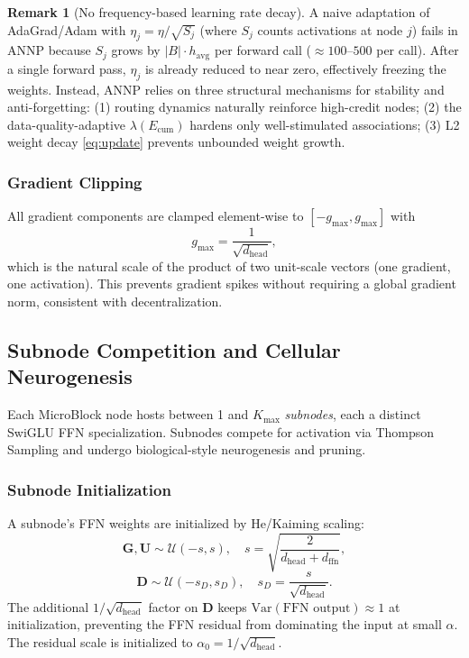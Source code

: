 \documentclass[11pt,a4paper]{article}
\theoremstyle{definition}
\newtheorem{remark}{Remark}[section]
\newcommand{\mG}{\mathbf{G}}
\newcommand{\mU}{\mathbf{U}}
\newcommand{\mD}{\mathbf{D}}
\begin{document}
\begin{remark}[No frequency-based learning rate decay]
  A naive adaptation of AdaGrad/Adam with $\eta_j = \eta / \sqrt{S_j}$ (where $S_j$ counts
  activations at node $j$) fails in ANNP because $S_j$ grows by $|B| \cdot h_\text{avg}$ per
  forward call ($\approx 100\text{--}500$ per call). After a single forward pass,
  $\eta_j$ is already reduced to near zero, effectively freezing the weights.
  Instead, ANNP relies on three structural mechanisms for stability and anti-forgetting:
  (1) routing dynamics naturally reinforce high-credit nodes;
  (2) the data-quality-adaptive $\lambda(E_\text{cum})$ hardens only well-stimulated associations;
  (3) L2 weight decay \eqref{eq:update} prevents unbounded weight growth.
\end{remark}

\subsubsection{Gradient Clipping}
All gradient components are clamped element-wise to $[-g_\text{max}, g_\text{max}]$ with
\begin{equation}
  g_\text{max} = \frac{1}{\sqrt{d_\text{head}}},
  \label{eq:gradclip}
\end{equation}
which is the natural scale of the product of two unit-scale vectors (one gradient, one activation).
This prevents gradient spikes without requiring a global gradient norm, consistent with decentralization.

\subsection{Subnode Competition and Cellular Neurogenesis}
\label{sec:subnodes}

Each MicroBlock node hosts between 1 and $K_\text{max}$ \emph{subnodes}, each a distinct
SwiGLU FFN specialization. Subnodes compete for activation via Thompson Sampling and undergo
biological-style neurogenesis and pruning.

\subsubsection{Subnode Initialization}

A subnode's FFN weights are initialized by He/Kaiming scaling:
\begin{equation}
  \mG, \mU \sim \mathcal{U}\!\left(-s, s\right),
  \quad s = \sqrt{\frac{2}{d_\text{head} + d_\text{ffn}}},
  \label{eq:init_gate}
\end{equation}
\begin{equation}
  \mD \sim \mathcal{U}\!\left(-s_D, s_D\right),
  \quad s_D = \frac{s}{\sqrt{d_\text{head}}}.
  \label{eq:init_down}
\end{equation}
The additional $1/\sqrt{d_\text{head}}$ factor on $\mD$ keeps
$\mathrm{Var}(\text{FFN output}) \approx 1$ at initialization,
preventing the FFN residual from dominating the input at small $\alpha$.
The residual scale is initialized to $\alpha_0 = 1/\sqrt{d_\text{head}}$.
\end{document}
